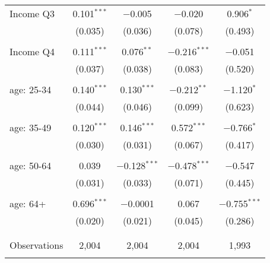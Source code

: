 \begin{tabular}{@{\extracolsep{5pt}}lcccc}
 Income Q3 & 0.101$^{***}$ & $-$0.005 & $-$0.020 & 0.906$^{*}$ \\ 
  & (0.035) & (0.036) & (0.078) & (0.493) \\ 
  & & & & \\ 
 Income Q4 & 0.111$^{***}$ & 0.076$^{**}$ & $-$0.216$^{***}$ & $-$0.051 \\ 
  & (0.037) & (0.038) & (0.083) & (0.520) \\ 
  & & & & \\ 
 age: 25-34 & 0.140$^{***}$ & 0.130$^{***}$ & $-$0.212$^{**}$ & $-$1.120$^{*}$ \\ 
  & (0.044) & (0.046) & (0.099) & (0.623) \\ 
  & & & & \\ 
 age: 35-49 & 0.120$^{***}$ & 0.146$^{***}$ & 0.572$^{***}$ & $-$0.766$^{*}$ \\ 
  & (0.030) & (0.031) & (0.067) & (0.417) \\ 
  & & & & \\ 
 age: 50-64 & 0.039 & $-$0.128$^{***}$ & $-$0.478$^{***}$ & $-$0.547 \\ 
  & (0.031) & (0.033) & (0.071) & (0.445) \\ 
  & & & & \\ 
 age: 64+ & 0.696$^{***}$ & $-$0.0001 & 0.067 & $-$0.755$^{***}$ \\ 
  & (0.020) & (0.021) & (0.045) & (0.286) \\ 
  & & & & \\ 
\hline \\[-1.8ex] 

Observations & 2,004 & 2,004 & 2,004 & 1,993 \\ 
\hline 
\hline \\[-1.8ex] 
\end{tabular} 